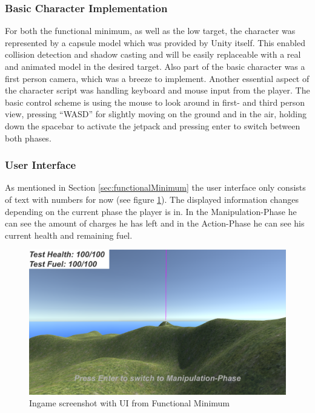 \documentclass[12pt, letterpaper]{scrartcl}
\begin{document}
	\subsubsection{Basic Character Implementation}
	For both the functional minimum, as well as the low target, the character was represented by a capsule model which was provided by Unity itself. This enabled collision detection and shadow casting and will be easily replaceable with a real and animated model in the desired target. Also part of the basic character was a first person camera, which was a breeze to implement. Another essential aspect of the character script was handling keyboard and mouse input from the player. The basic control scheme is using the mouse to look around in first- and third person view, pressing “WASD” for slightly moving on the ground and in the air, holding down the spacebar to activate the jetpack and pressing enter to switch between both phases.
	
	\subsubsection{User Interface}
	As mentioned in Section \ref{sec:functionalMinimum} the user interface only consists of text with numbers for now (see figure \ref{fig:screenshot}). The displayed information changes depending on the current phase the player is in. In the Manipulation-Phase he can see the amount of charges he has left and in the Action-Phase he can see his current health and remaining fuel.
	\begin{figure}
		\includegraphics[width=\textwidth]{images/interim/screenshot}
		\caption{Ingame screenshot with UI from Functional Minimum}
		\label{fig:screenshot}
	\end{figure}
	
\end{document}
